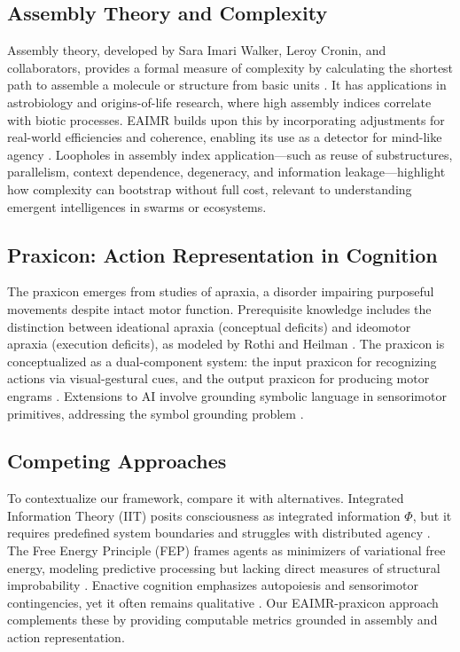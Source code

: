 \documentclass{article}
\begin{document}
\subsection{Assembly Theory and Complexity}
Assembly theory, developed by Sara Imari Walker, Leroy Cronin, and collaborators, provides a formal measure of complexity by calculating the shortest path to assemble a molecule or structure from basic units \citep{cronin2016, walker2013}. It has applications in astrobiology and origins-of-life research, where high assembly indices correlate with biotic processes. EAIMR builds upon this by incorporating adjustments for real-world efficiencies and coherence, enabling its use as a detector for mind-like agency \citep{adami2012}. Loopholes in assembly index application—such as reuse of substructures, parallelism, context dependence, degeneracy, and information leakage—highlight how complexity can bootstrap without full cost, relevant to understanding emergent intelligences in swarms or ecosystems.

\subsection{Praxicon: Action Representation in Cognition}
The praxicon emerges from studies of apraxia, a disorder impairing purposeful movements despite intact motor function. Prerequisite knowledge includes the distinction between ideational apraxia (conceptual deficits) and ideomotor apraxia (execution deficits), as modeled by Rothi and Heilman \citep{mantovani2010}. The praxicon is conceptualized as a dual-component system: the input praxicon for recognizing actions via visual-gestural cues, and the output praxicon for producing motor engrams \citep{peigneux2004}. Extensions to AI involve grounding symbolic language in sensorimotor primitives, addressing the symbol grounding problem \citep{harnad1990, pastra2011}.

\subsection{Competing Approaches}
To contextualize our framework, compare it with alternatives. Integrated Information Theory (IIT) posits consciousness as integrated information \(\Phi\), but it requires predefined system boundaries and struggles with distributed agency \citep{tononi2004}. The Free Energy Principle (FEP) frames agents as minimizers of variational free energy, modeling predictive processing but lacking direct measures of structural improbability \citep{friston2010}. Enactive cognition emphasizes autopoiesis and sensorimotor contingencies, yet it often remains qualitative \citep{barandiaran2009}. Our EAIMR-praxicon approach complements these by providing computable metrics grounded in assembly and action representation.
\end{document}
